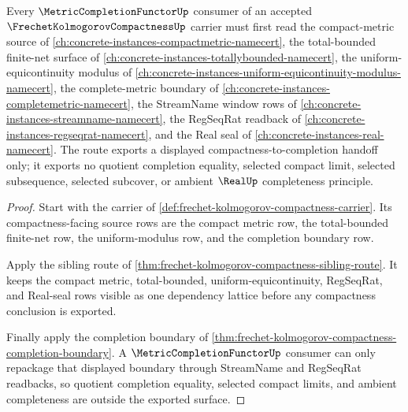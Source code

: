 \begin{theorem}
\label{thm:frechet-kolmogorov-compactness-metric-completion-route}
Every $\MetricCompletionFunctorUp$ consumer of an accepted $\FrechetKolmogorovCompactnessUp$ carrier must first read the compact-metric source of \autoref{ch:concrete-instances-compactmetric-namecert}, the total-bounded finite-net surface of \autoref{ch:concrete-instances-totallybounded-namecert}, the uniform-equicontinuity modulus of \autoref{ch:concrete-instances-uniform-equicontinuity-modulus-namecert}, the complete-metric boundary of \autoref{ch:concrete-instances-completemetric-namecert}, the StreamName window rows of \autoref{ch:concrete-instances-streamname-namecert}, the RegSeqRat readback of \autoref{ch:concrete-instances-regseqrat-namecert}, and the Real seal of \autoref{ch:concrete-instances-real-namecert}. The route exports a displayed compactness-to-completion handoff only; it exports no quotient completion equality, selected compact limit, selected subsequence, selected subcover, or ambient $\RealUp$ completeness principle.
\end{theorem}
\begin{proof}
Start with the carrier of \autoref{def:frechet-kolmogorov-compactness-carrier}. Its compactness-facing source rows are the compact metric row, the total-bounded finite-net row, the uniform-modulus row, and the completion boundary row.

Apply the sibling route of \autoref{thm:frechet-kolmogorov-compactness-sibling-route}. It keeps the compact metric, total-bounded, uniform-equicontinuity, RegSeqRat, and Real-seal rows visible as one dependency lattice before any compactness conclusion is exported.

Finally apply the completion boundary of \autoref{thm:frechet-kolmogorov-compactness-completion-boundary}. A $\MetricCompletionFunctorUp$ consumer can only repackage that displayed boundary through StreamName and RegSeqRat readbacks, so quotient completion equality, selected compact limits, and ambient completeness are outside the exported surface.
\end{proof}
